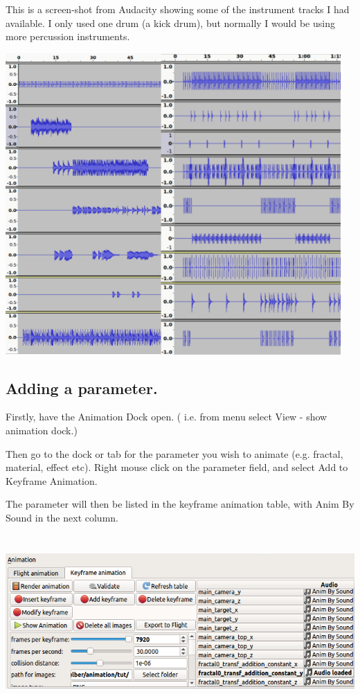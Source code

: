 This is a screen-shot from Audacity showing some of the instrument
tracks I had available. I only used one drum (a kick drum), but normally
I would be using more percussion instruments.

\includegraphics[width=5.04000in,height=4.53000in]{img/sound/media/image2.png}

\subsection{Adding a parameter.}\label{adding-a-parameter.}

Firstly, have the Animation Dock open. ( i.e. from menu select View -
show animation dock.)

Then go to the dock or tab for the parameter you wish to animate (e.g.
fractal, material, effect etc). Right mouse click on the parameter
field, and select Add to Keyframe Animation.

The parameter will then be listed in the keyframe animation table, with
Anim By Sound in the next column.

\includegraphics[width=6.69000in,height=2.60000in]{img/sound/media/image3.png}

